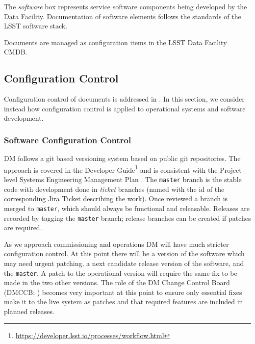 The \textit{software} box represents service software components being developed by the Data Facility.
Documentation of software elements follows the standards of the \gls{LSST} software \gls{stack}.

Documents are managed as \gls{configuration} items in the \gls{LSST} Data Facility \gls{CMDB}.

\subsection {Configuration Control} \label{sect:config}

Configuration control of documents is addressed in . In this section, we consider instead how \gls{configuration} control is applied to operational systems and software development.

\subsubsection{Software Configuration Control}

DM follows a \gls{git} based versioning system based on public \gls{git} repositories.  The approach is covered in the Developer Guide\footnote{\url{https://developer.lsst.io/processes/workflow.html}} and is consistent with the Project-level \gls{Systems Engineering} Management Plan .
The \texttt{master} branch is the stable code with development done in \emph{ticket} branches (named with the id of the corresponding Jira Ticket describing the work).
Once reviewed a branch is merged to \texttt{master}, which should always be functional and releasable.
Releases are recorded by tagging the \texttt{master} branch; release branches can be created if patches are required.

As we approach commissioning and operations \gls{DM} will have much stricter \gls{configuration} control.
At this point there will be a version of the software which may need urgent patching, a next candidate release version of the software, and the \texttt{master}.
A \gls{patch} to the operational version will require the same fix to be made in the two other versions.
The role of the DM \gls{Change Control Board} (\gls{DMCCB}; ) becomes very important at this point to ensure only essential fixes make it to the live system as patches and that required features are included in planned releases.

